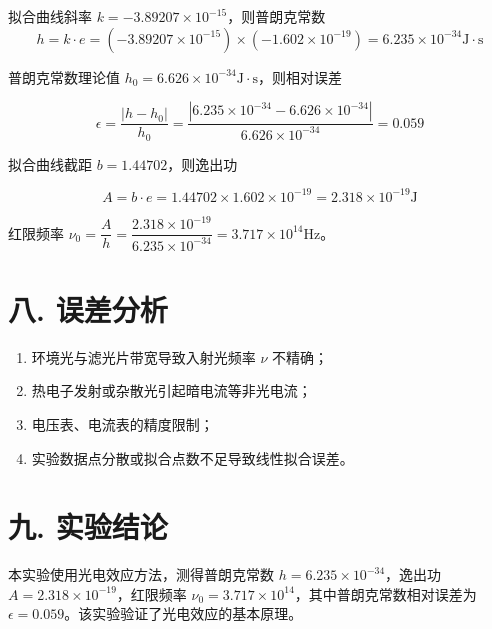 \documentclass[12pt,a4paper]{article}
\begin{document}
\begin{enumerate}
	拟合曲线斜率 $k = -3.89207\times 10^{-15}$，则普朗克常数
	$$h = k\cdot e = (-3.89207\times 10^{-15}) \times (-1.602 \times 10^{-19}) = 6.235 \times 10^{-34}\mathrm{J\cdot s}$$

	普朗克常数理论值 $h_0 = 6.626 \times 10^{-34}\mathrm{J\cdot s}$，则相对误差 
	
	$$\epsilon = \dfrac{|h-h_0|}{h_0} = \dfrac{|6.235 \times 10^{-34} - 6.626 \times 10^{-34}|}{6.626 \times 10^{-34}} = 0.059$$

	拟合曲线截距 $b = 1.44702$，则逸出功

	$$A = b \cdot e = 1.44702 \times 1.602 \times 10^{-19} = 2.318 \times 10^{-19} \mathrm{J}$$

	红限频率 $\nu_0 = \dfrac{A}{h} = \dfrac{2.318 \times 10^{-19}}{6.235 \times 10^{-34}} = 3.717 \times 10^{14} \mathrm{Hz}$。

	\end{enumerate}
	
	
	\section*{\textbf{八. 误差分析}}

	\begin{enumerate}
		\item 环境光与滤光片带宽导致入射光频率 $\nu$ 不精确；
		\item 热电子发射或杂散光引起暗电流等非光电流；
		\item 电压表、电流表的精度限制；
		\item 实验数据点分散或拟合点数不足导致线性拟合误差。
	\end{enumerate}

	
	\section*{\textbf{{九. 实验结论}}}

	本实验使用光电效应方法，测得普朗克常数 $h = 6.235 \times 10^{-34}$，逸出功 $A = 2.318 \times 10^{-19}$，红限频率 $\nu_0 = 3.717 \times 10^{14}$，其中普朗克常数相对误差为 $\epsilon = 0.059$。该实验验证了光电效应的基本原理。
\end{document}
